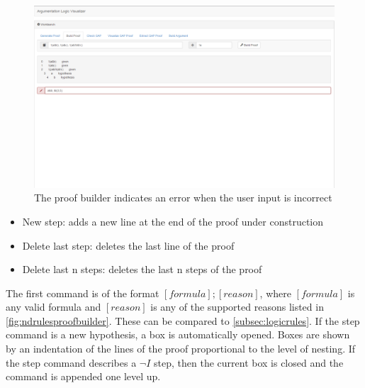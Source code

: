 \documentclass[11pt,twoside,a4paper]{report}
\begin{document}
\begin{figure}[htp]
\centerline{\includegraphics[scale=0.3]{img/scr-client-proofbuilderr.png}}
\caption{The proof builder indicates an error when the user input is incorrect\label{fig:scrclientproofbuilderr}}
\end{figure}

\begin{itemize}
\item
New step: adds a new line at the end of the proof under construction
\item
Delete last step: deletes the last line of the proof
\item
Delete last n steps: deletes the last n steps of the proof
\end{itemize}

The first command is of the format $[formula]; [reason]$, where $[formula]$ is any valid formula and $[reason]$ is any of the supported reasons listed in \autoref{fig:ndrulesproofbuilder}. These can be compared to \autoref{subsec:logicrules}. If the step command is a new hypothesis, a box is automatically opened. Boxes are shown by an indentation of the lines of the proof proportional to the level of nesting. If the step command describes a $\neg I$ step, then the current box is closed and the command is appended one level up.
\end{document}
